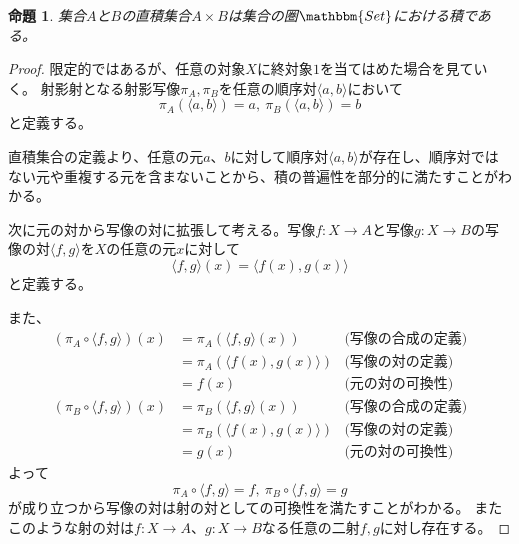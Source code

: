 \documentclass[dvipdfmx]{jsarticle}
\newcommand{\cat}[1]{\mathbbm{#1}}
\newcommand{\arrow}{\rightarrow}
\newcommand{\tuple}[1]{\langle #1\rangle}
\newcommand{\mor}[3]{#1:#2\arrow #3}
\newtheorem{proof}{証明}[section]
\newtheorem{prop}{命題}[section]
\numberwithin{proof}{subsection}
\numberwithin{prop}{subsection}
\numberwithin{define}{subsection}
\begin{document}
	\begin{prop}
	集合$A$と$B$の直積集合$A\times B$は集合の圏$\cat{Set}$における積である。
	\end{prop}
	\begin{proof}
		限定的ではあるが、任意の対象$X$に終対象$1$を当てはめた場合を見ていく。
		射影射となる射影写像$\pi_A,\pi_B$を任意の順序対$\tuple{a,b}$において\[\pi_A(\tuple{a,b})=a,\ \pi_B(\tuple{a,b})=b\]と定義する。

		直積集合の定義より、任意の元$a$、$b$に対して順序対$\tuple{a,b}$が存在し、順序対ではない元や重複する元を含まないことから、積の普遍性を部分的に満たすことがわかる。
		\begin{center}
		\end{center}
		次に元の対から写像の対に拡張して考える。写像$\mor{f}{X}{A}$と写像$\mor{g}{X}{B}$の写像の対$\tuple{f,g}$を$X$の任意の元$x$に対して\[\tuple{f,g}(x)=\tuple{f(x),g(x)}\]と定義する。

		また、
		\begin{align*}
			(\pi_A\circ\tuple{f,g})(x)&=\pi_A(\tuple{f,g}(x))&\text{(写像の合成の定義)}\\
			&=\pi_A(\tuple{f(x),g(x)})&\text{(写像の対の定義)}\\
			&=f(x)&\text{(元の対の可換性)}\\
			(\pi_B\circ\tuple{f,g})(x)&=\pi_B(\tuple{f,g}(x))&\text{(写像の合成の定義)}\\
			&=\pi_B(\tuple{f(x),g(x)})&\text{(写像の対の定義)}\\
			&=g(x)&\text{(元の対の可換性)}
		\end{align*}
		よって\[\pi_A\circ\tuple{f,g}=f,\ \pi_B\circ\tuple{f,g}=g\]が成り立つから写像の対は射の対としての可換性を満たすことがわかる。
		またこのような射の対は$\mor{f}{X}{A}$、$\mor{g}{X}{B}$なる任意の二射$f,g$に対し存在する。


\end{proof}
\end{document}
